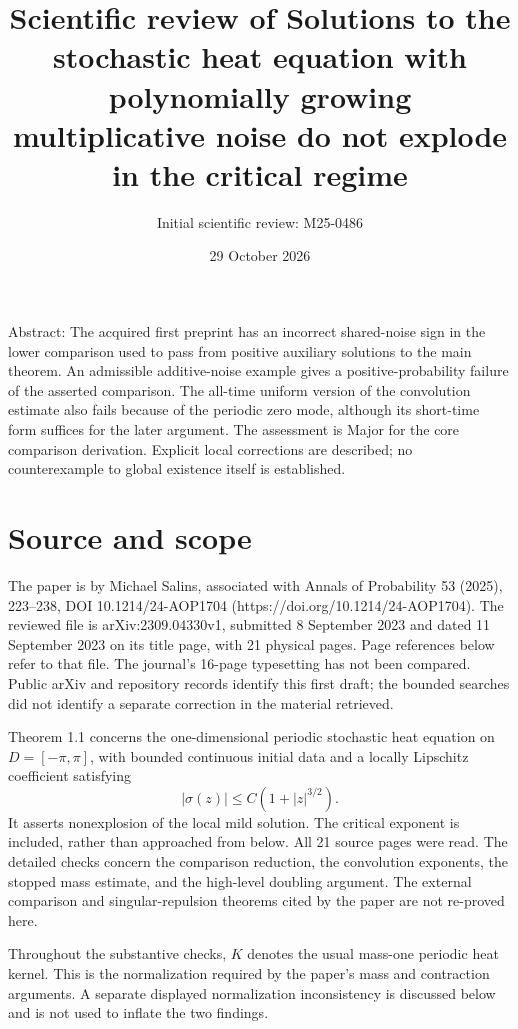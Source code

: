 \documentclass[10pt]{article}
\title{Scientific review of
Solutions to the stochastic heat equation with polynomially growing multiplicative noise do not explode in the critical regime}
\author{Initial scientific review: M25-0486}
\date{29 October 2026}
\begin{document}
\maketitle
Abstract: The acquired first preprint has an incorrect shared-noise sign in the lower comparison used to pass from positive auxiliary solutions to the main theorem. An admissible additive-noise example gives a positive-probability failure of the asserted comparison. The all-time uniform version of the convolution estimate also fails because of the periodic zero mode, although its short-time form suffices for the later argument. The assessment is Major for the core comparison derivation. Explicit local corrections are described; no counterexample to global existence itself is established.\par
\section*{Source and scope}
The paper is by Michael Salins, associated with Annals of Probability 53 (2025), 223–238, DOI 10.1214/24-AOP1704 (https://doi.org/10.1214/24-AOP1704). The reviewed file is arXiv:2309.04330v1, submitted 8 September 2023 and dated 11 September 2023 on its title page, with 21 physical pages. Page references below refer to that file. The journal’s 16-page typesetting has not been compared. Public arXiv and repository records identify this first draft; the bounded searches did not identify a separate correction in the material retrieved.\par
Theorem 1.1 concerns the one-dimensional periodic stochastic heat equation on \(D=[-\pi,\pi]\), with bounded continuous initial data and a locally Lipschitz coefficient satisfying \[|\sigma(z)|\le C(1+|z|^{3/2}).\] It asserts nonexplosion of the local mild solution. The critical exponent is included, rather than approached from below. All 21 source pages were read. The detailed checks concern the comparison reduction, the convolution exponents, the stopped mass estimate, and the high-level doubling argument. The external comparison and singular-repulsion theorems cited by the paper are not re-proved here.\par
Throughout the substantive checks, \(K\) denotes the usual mass-one periodic heat kernel. This is the normalization required by the paper’s mass and contraction arguments. A separate displayed normalization inconsistency is discussed below and is not used to inflate the two findings.\par
\end{document}
